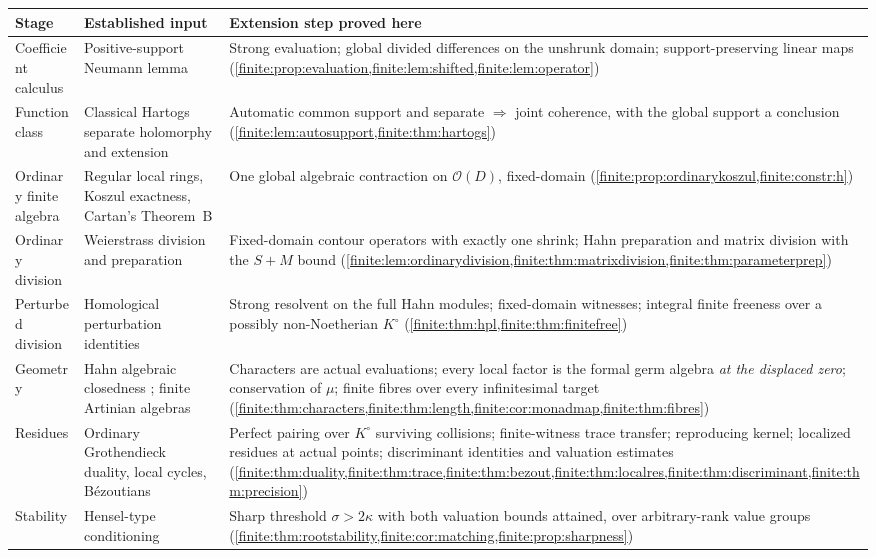 \documentclass[11pt,letterpaper]{article}
\theoremstyle{definition}
\theoremstyle{remark}
\newcommand{\OO}{\mathcal O}
\newcommand{\Kc}{K^{\circ}}
\numberwithin{equation}{section}
\begin{document}
\begin{center}\small
\begin{longtable}{@{}L{0.20\textwidth}L{0.33\textwidth}L{0.40\textwidth}@{}}
\toprule
Stage & Established input & Extension step proved here\\
\midrule
\endhead
Coefficient calculus & Positive-support Neumann lemma \cite{finite:Neumann,finite:Poonen} &
Strong evaluation; global divided differences on the unshrunk domain; support-preserving linear maps (\cref{finite:prop:evaluation,finite:lem:shifted,finite:lem:operator})\\[0.35em]
Function class & Classical Hartogs separate holomorphy and extension \cite{finite:BK,finite:Lebl} &
Automatic common support and separate $\Rightarrow$ joint coherence, with the global support a conclusion (\cref{finite:lem:autosupport,finite:thm:hartogs})\\[0.35em]
Ordinary finite algebra & Regular local rings, Koszul exactness, Cartan's Theorem~B \cite{finite:Cartan,finite:GunningRossi,finite:Demailly,finite:StacksKoszul} &
One global algebraic contraction on $\OO(D)$, fixed-domain (\cref{finite:prop:ordinarykoszul,finite:constr:h})\\[0.35em]
Ordinary division & Weierstrass division and preparation \cite{finite:GunningRossi,finite:Lebl} &
Fixed-domain contour operators with exactly one shrink; Hahn preparation and matrix division with the $S+M$ bound (\cref{finite:lem:ordinarydivision,finite:thm:matrixdivision,finite:thm:parameterprep})\\[0.35em]
Perturbed division & Homological perturbation identities \cite{finite:Crainic} &
Strong resolvent on the full Hahn modules; fixed-domain witnesses; integral finite freeness over a possibly non-Noetherian $\Kc$ (\cref{finite:thm:hpl,finite:thm:finitefree})\\[0.35em]
Geometry & Hahn algebraic closedness \cite[Cor.~4]{finite:Poonen}; finite Artinian algebras &
Characters are actual evaluations; every local factor is the formal germ algebra \emph{at the displaced zero}; conservation of $\mu$; finite fibres over every infinitesimal target (\cref{finite:thm:characters,finite:thm:length,finite:cor:monadmap,finite:thm:fibres})\\[0.35em]
Residues & Ordinary Grothendieck duality, local cycles, B\'ezoutians \cite{finite:GriffithsHarris,finite:Hartshorne,finite:Kunz,finite:CattaniDickenstein,finite:CDS,finite:NayakSastry} &
Perfect pairing over $\Kc$ surviving collisions; finite-witness trace transfer; reproducing kernel; localized residues at actual points; discriminant identities and valuation estimates (\cref{finite:thm:duality,finite:thm:trace,finite:thm:bezout,finite:thm:localres,finite:thm:discriminant,finite:thm:precision})\\[0.35em]
Stability & Hensel-type conditioning &
Sharp threshold $\sigma>2\kappa$ with both valuation bounds attained, over arbitrary-rank value groups (\cref{finite:thm:rootstability,finite:cor:matching,finite:prop:sharpness})\\
\bottomrule
\end{longtable}
\end{center}
\end{document}
